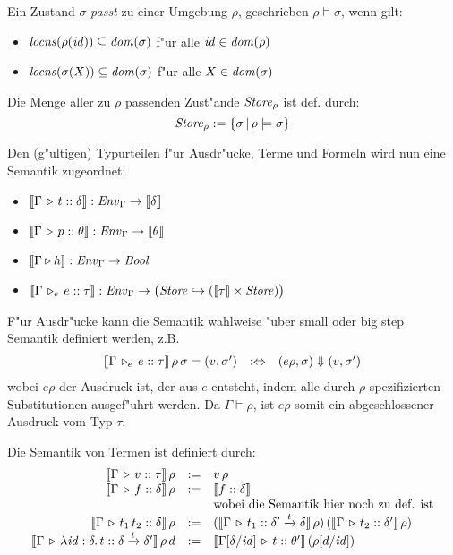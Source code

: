 \documentclass[12pt,a4paper,bigheadings]{scrartcl}
\newcommand{\semantic}[1]{\ensuremath{\llbracket#1\rrbracket}}
\newcommand{\locns}{\name{locns}}
\newcommand{\tto}{\ensuremath{\xrightarrow{t}}}
\newcommand{\Tje}[3]{#1 \,\tr_e\, #2\cc#3}
\begin{document}
\noindent
Ein Zustand $\sigma$ {\em passt} zu einer Umgebung $\rho$, geschrieben $\rho \models \sigma$,
wenn gilt:
\begin{itemize}
  \item $\locns(\rho(\id)) \subseteq \dom{\sigma}$ f"ur alle ${\text{\it id\/}}\in{\text{\it dom\/}}(\rho)$
  \item $\locns(\sigma(X)) \subseteq \dom{\sigma}$ f"ur alle $X\in{\text{\it dom\/}}(\sigma)$
\end{itemize}
Die Menge aller zu $\rho$ passenden Zust"ande ${\text{\it Store\/}}_\rho$ ist def. durch:
\[
  {\text{\it Store\/}}_\rho := \{\sigma\,|\,\rho\models\sigma\}
\]

\noindent
Den (g"ultigen) Typurteilen f"ur Ausdr"ucke, Terme und Formeln wird nun eine Semantik zugeordnet:
\begin{itemize}
  \item $\semantic{\Tj{\Gamma}{t}{\delta}}:\Env_\Gamma \to \semantic{\delta}$
  \item $\semantic{\Tj{\Gamma}{p}{\theta}}:\Env_\Gamma \to \semantic{\theta}$
  \item $\semantic{\Tjh{\Gamma}{h}}: \Env_\Gamma \to \Bool$
  \item $\semantic{\Tje{\Gamma}{e}{\tau}}: \Env_\Gamma \to \bigl( \Store \pto (\semantic{\tau}\times\Store) \bigr)$
\end{itemize}

\noindent
F"ur Ausdr"ucke kann die Semantik wahlweise "uber small oder big step Semantik definiert
werden, z.B.
\[\begin{array}{rcl}
  \semantic{\Tje{\Gamma}{e}{\tau}}\,\rho\,\sigma = (v,\sigma')
  & :\Leftrightarrow &
  (e\rho,\sigma) \Downarrow (v,\sigma')
\end{array}\]
wobei $e \rho$ der Ausdruck ist, der aus $e$ entsteht, indem alle durch $\rho$ spezifizierten
Substitutionen ausgef"uhrt werden. Da $\Gamma \models \rho$, ist $e \rho$ somit ein abgeschlossener
Ausdruck vom Typ $\tau$.

\pagebreak[3] \noindent
Die Semantik von Termen ist definiert durch:
\[\begin{array}{rcl}
  \semantic{\Tj{\Gamma}{v}{\tau}}\,\rho
  & := &
  v\,\rho 
  \\
  \semantic{\Tj{\Gamma}{f}{\delta}}\,\rho
  & := &
  \semantic{\tj{f}{\delta}} \\
  && \text{wobei die Semantik hier noch zu def. ist}
  \\
  \semantic{\Tj{\Gamma}{\app{t_1}{t_2}}{\delta}}\,\rho
  & := &
  (\semantic{\Tj{\Gamma}{t_1}{\delta'\tto\delta}}\,\rho)\,(\semantic{\Tj{\Gamma}{t_2}{\delta'}}\,\rho)
  \\
  \semantic{\Tj{\Gamma}{\abstr{\id:\delta}{t}}{\delta\tto\delta'}}\,\rho\,d
  & := &
  \semantic{\Tj{\Gamma[\delta/\id]}{t}{\theta'}}\,(\rho[d/\id])
\end{array}\]
\end{document}

